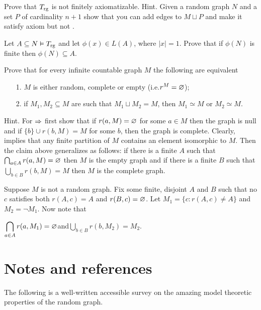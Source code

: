 \documentclass[creche.tex]{subfiles}
\begin{document}
\begin{exercise}
Prove that $T_{\rm rg}$ is not finitely axiomatizable. Hint. Given a random graph $N$ and a set $P$ of cardinality $n+1$ show that you can add edges to $M\sqcup P$ and make it satisfy axiom  but not .\QED
\end{exercise}

\begin{exercise}\label{ex_rg_small_def_set}
Let $A\subseteq N\models T_{\rm rg}$ and let $\phi(x)\in L(A)$, where $|x|=1$. Prove that if $\phi(N)$ is finite then $\phi(N)\subseteq A$.\QED
\end{exercise}

\begin{exercise}
Prove that for every infinite countable graph $M$ the following are equivalent
\begin{itemize}
\item[1.] $M$ is either random, complete or empty (i.e.\@ $r^M=\0$);
\item[2.] if $M_1,M_2\subseteq M$ are such that $M_1\sqcup M_2=M$, then $M_1\simeq M$ or $M_2\simeq M$.
\end{itemize}
Hint. For $\IMP$ first show that if $r(a,M)=\0$ for some $a\in M$ then the graph is null and if $\{b\}\cup r(b,M)=M$ for some $b$, then the graph is complete. Clearly,  implies that any finite partition of $M$ contains an element isomorphic to $M$. Then the claim above generalizes as follows: if there is a finite $A$ such that $\bigcap_{a\in A}r(a, M)=\0$ then $M$ is the empty graph and if there is a finite $B$ such that $\bigcup_{b\in B}r(b,M)=M$ then $M$ is the complete graph. 

Suppose $M$ is not a random graph. Fix some finite, disjoint $A$ and $B$ such that no $c$ satisfies both $r(A,c)= A$ and $r(B,c)=\0$. Let $M_1=\{c:r(A,c)\neq A\}$ and $M_2=\neg M_1$.  Now note that 

\hfill$\displaystyle\bigcap_{a\in A}r(a, M_1)=\0$\hfill and\hfill $\displaystyle\bigcup_{b\in B}r(b, M_2)=M_2$.\QED
\end{exercise}

\section{Notes and references}

The following is a well-written accessible survey on the amazing model theoretic properties of the random graph.

\begin{biblist}[]\normalsize
\end{biblist}
\end{document}

